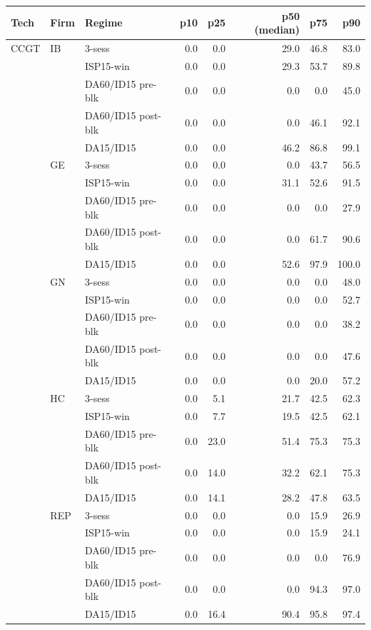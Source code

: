 \begin{tabular}{l l l r r r r r}
\toprule
Tech & Firm & Regime & p10 & p25 & p50 (median) & p75 & p90 \\
\midrule
CCGT & IB & 3-sess & 0.0 & 0.0 & 29.0 & 46.8 & 83.0 \\
 &  & ISP15-win & 0.0 & 0.0 & 29.3 & 53.7 & 89.8 \\
 &  & DA60/ID15 pre-blk & 0.0 & 0.0 & 0.0 & 0.0 & 45.0 \\
 &  & DA60/ID15 post-blk & 0.0 & 0.0 & 0.0 & 46.1 & 92.1 \\
 &  & DA15/ID15 & 0.0 & 0.0 & 46.2 & 86.8 & 99.1 \\
 & GE & 3-sess & 0.0 & 0.0 & 0.0 & 43.7 & 56.5 \\
 &  & ISP15-win & 0.0 & 0.0 & 31.1 & 52.6 & 91.5 \\
 &  & DA60/ID15 pre-blk & 0.0 & 0.0 & 0.0 & 0.0 & 27.9 \\
 &  & DA60/ID15 post-blk & 0.0 & 0.0 & 0.0 & 61.7 & 90.6 \\
 &  & DA15/ID15 & 0.0 & 0.0 & 52.6 & 97.9 & 100.0 \\
 & GN & 3-sess & 0.0 & 0.0 & 0.0 & 0.0 & 48.0 \\
 &  & ISP15-win & 0.0 & 0.0 & 0.0 & 0.0 & 52.7 \\
 &  & DA60/ID15 pre-blk & 0.0 & 0.0 & 0.0 & 0.0 & 38.2 \\
 &  & DA60/ID15 post-blk & 0.0 & 0.0 & 0.0 & 0.0 & 47.6 \\
 &  & DA15/ID15 & 0.0 & 0.0 & 0.0 & 20.0 & 57.2 \\
 & HC & 3-sess & 0.0 & 5.1 & 21.7 & 42.5 & 62.3 \\
 &  & ISP15-win & 0.0 & 7.7 & 19.5 & 42.5 & 62.1 \\
 &  & DA60/ID15 pre-blk & 0.0 & 23.0 & 51.4 & 75.3 & 75.3 \\
 &  & DA60/ID15 post-blk & 0.0 & 14.0 & 32.2 & 62.1 & 75.3 \\
 &  & DA15/ID15 & 0.0 & 14.1 & 28.2 & 47.8 & 63.5 \\
 & REP & 3-sess & 0.0 & 0.0 & 0.0 & 15.9 & 26.9 \\
 &  & ISP15-win & 0.0 & 0.0 & 0.0 & 15.9 & 24.1 \\
 &  & DA60/ID15 pre-blk & 0.0 & 0.0 & 0.0 & 0.0 & 76.9 \\
 &  & DA60/ID15 post-blk & 0.0 & 0.0 & 0.0 & 94.3 & 97.0 \\
 &  & DA15/ID15 & 0.0 & 16.4 & 90.4 & 95.8 & 97.4 \\

\end{tabular}
